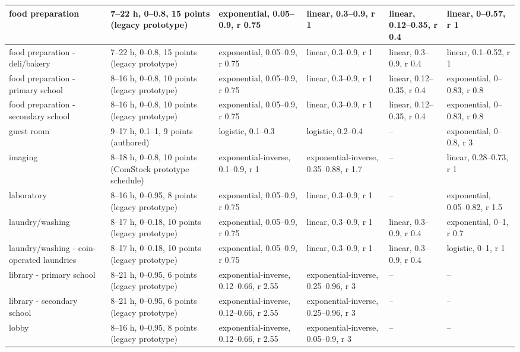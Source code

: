 \begin{center}
\begin{longtable}{|p{1.5in}|p{1.6in}|p{0.95in}|p{0.95in}|p{0.8in}|p{0.8in}|}
food preparation & 7--22 h, 0--0.8, 15 points (legacy prototype) & exponential, 0.05--0.9, r 0.75 & linear, 0.3--0.9, r 1 & linear, 0.12--0.35, r 0.4 & linear, 0--0.57, r 1 \\ \hline
food preparation - deli/bakery & 7--22 h, 0--0.8, 15 points (legacy prototype) & exponential, 0.05--0.9, r 0.75 & linear, 0.3--0.9, r 1 & linear, 0.3--0.9, r 0.4 & linear, 0.1--0.52, r 1 \\ \hline
food preparation - primary school & 8--16 h, 0--0.8, 10 points (legacy prototype) & exponential, 0.05--0.9, r 0.75 & linear, 0.3--0.9, r 1 & linear, 0.12--0.35, r 0.4 & exponential, 0--0.83, r 0.8 \\ \hline
food preparation - secondary school & 8--16 h, 0--0.8, 10 points (legacy prototype) & exponential, 0.05--0.9, r 0.75 & linear, 0.3--0.9, r 1 & linear, 0.12--0.35, r 0.4 & exponential, 0--0.83, r 0.8 \\ \hline
guest room & 9--17 h, 0.1--1, 9 points (authored) & logistic, 0.1--0.3 & logistic, 0.2--0.4 & -- & exponential, 0--0.8, r 3 \\ \hline
imaging & 8--18 h, 0--0.8, 10 points (ComStock prototype schedule) & exponential-inverse, 0.1--0.9, r 1 & exponential-inverse, 0.35--0.88, r 1.7 & -- & linear, 0.28--0.73, r 1 \\ \hline
laboratory & 8--16 h, 0--0.95, 8 points (legacy prototype) & exponential, 0.05--0.9, r 0.75 & linear, 0.3--0.9, r 1 & -- & exponential, 0.05--0.82, r 1.5 \\ \hline
laundry/washing & 8--17 h, 0--0.18, 10 points (legacy prototype) & exponential, 0.05--0.9, r 0.75 & linear, 0.3--0.9, r 1 & linear, 0.3--0.9, r 0.4 & exponential, 0--1, r 0.7 \\ \hline
laundry/washing - coin-operated laundries & 8--17 h, 0--0.18, 10 points (legacy prototype) & exponential, 0.05--0.9, r 0.75 & linear, 0.3--0.9, r 1 & linear, 0.3--0.9, r 0.4 & logistic, 0--1, r 1 \\ \hline
library - primary school & 8--21 h, 0--0.95, 6 points (legacy prototype) & exponential-inverse, 0.12--0.66, r 2.55 & exponential-inverse, 0.25--0.96, r 3 & -- & -- \\ \hline
library - secondary school & 8--21 h, 0--0.95, 6 points (legacy prototype) & exponential-inverse, 0.12--0.66, r 2.55 & exponential-inverse, 0.25--0.96, r 3 & -- & -- \\ \hline
lobby & 8--16 h, 0--0.95, 8 points (legacy prototype) & exponential-inverse, 0.12--0.66, r 2.55 & exponential-inverse, 0.05--0.9, r 3 & -- & -- \\ \hline

\end{longtable}
\end{center}

